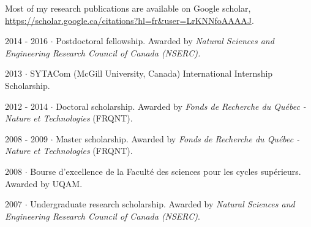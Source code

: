 \documentclass{cv}
\begin{document}
Most of my research publications are available on Google scholar, \url{https://scholar.google.ca/citations?hl=fr&user=LrKNNfoAAAAJ}.

\begin{formation}
  \item[2014 - 2016]
    $\cdot$ Postdoctoral fellowship. Awarded by \textit{Natural Sciences and Engineering Research Council of Canada (NSERC).}
   \item[2013]
     $\cdot$ SYTACom (McGill University, Canada) International Internship Scholarship.
   \item[2012 - 2014]
     $\cdot$ Doctoral scholarship. Awarded by \textit{Fonds de Recherche du Qu\'ebec - Nature et Technologies} (FRQNT).
   \item[2008 - 2009]
     $\cdot$ Master scholarship. Awarded by \textit{Fonds de Recherche du Qu\'ebec - Nature et Technologies} (FRQNT).
   \item[2008]
     $\cdot$ Bourse d'excellence de la Facult\'e des sciences pour les cycles sup\'erieurs. Awarded by UQAM.
   \item[2007]
     $\cdot$ Undergraduate research scholarship. Awarded by \textit{Natural Sciences and Engineering Research Council of Canada (NSERC)}.
\end{formation}



%
%
%
\end{document}
